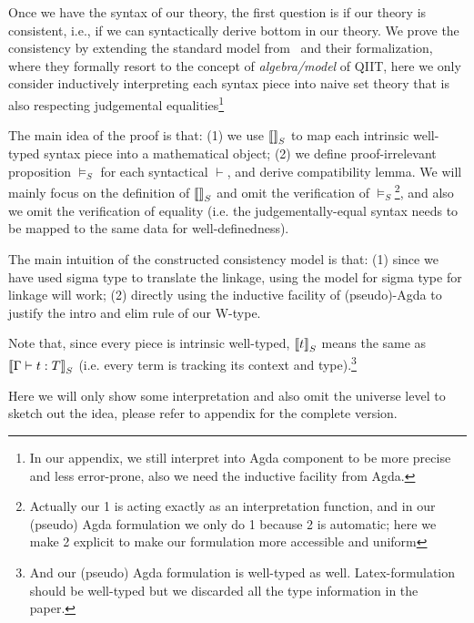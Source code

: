 Once we have the syntax of our theory, the first question is if our theory is consistent, i.e., if we can syntactically derive bottom in our theory. We prove the consistency by extending the standard model from~\cite{altkap2016,kaposi2017type, kaposi2019gluing} and their formalization, where they formally resort to the concept of \textit{algebra/model} of QIIT, here we only consider inductively interpreting each syntax piece into naive set theory that is also respecting judgemental equalities\footnote{In our appendix, we still interpret into Agda component to be more precise and less error-prone, also we need the inductive facility from Agda.} 

The main idea of the proof is that: (1) we use ${{\llbracket {} \rrbracket}_S}$ to map each intrinsic well-typed syntax piece into a mathematical object; (2) we define proof-irrelevant proposition $\models_S$ for each syntactical $\vdash$, and derive compatibility lemma. We will mainly focus on the definition of ${{\llbracket {} \rrbracket}_S}$ and omit the verification of $\models_S$\footnote{Actually our 1 is acting exactly as an interpretation function, and in our (pseudo) Agda formulation we only do 1 because 2 is automatic; here we make 2 explicit to make our formulation more accessible and uniform}, and also we omit the verification of equality (i.e. the judgementally-equal syntax needs to be mapped to the same data for well-definedness).


The main intuition of the constructed consistency model is that: (1) since we have used sigma type to translate the linkage, using the model for sigma type for linkage will work; (2) directly using the inductive facility of (pseudo)-Agda to justify the intro and elim rule of our W-type.

Note that, since every piece is intrinsic well-typed, ${{\llbracket {t} \rrbracket}_S}$ means the same as ${{\llbracket {{ {\Gamma} \vdash {t} : {T} }} \rrbracket}_S}$ (i.e. every term is tracking its context and type).\footnote{And our (pseudo) Agda formulation is well-typed as well. Latex-formulation should be well-typed but we discarded all the type information in the paper.}

Here we will only show some interpretation and also omit the universe level to sketch out the idea, please refer to appendix for the complete version. 

\newcommand{\goodCtxS}[2]{{ {#1} \ \models_S }}
\newcommand{\goodTypeS}[3]{{ {#1} \models_S {#2} }}
\newcommand{\goodTermS}[3]{{ {#1} \models_S {#2} : {#3} }}
\newcommand{\goodSubS}[3]{{ {#1} \models_S {#2} : {#3} }}
\newcommand{\goodSigS}[3]{{ {#1} \models_S {#2} \ \  Sig^{#3} }}
\newcommand{\goodWSigS}[3]{{ {#1} \models_S {#2} \ \ WSig^{#3} }}
\newcommand{\goodSealS}[4]{{ {#1} \models_S {#2} : {#3} \  |\  {#4} }}
\newcommand{\goodInhS}[4]{{ {#1} \models_S {#2} : {#3} \twoheadrightarrow {#4}}}


